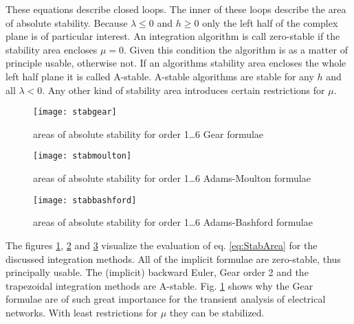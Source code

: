 These equations describe closed loops. The inner of these loops
describe the area of absolute stability.  Because $\lambda \le 0$ and
$h \ge 0$ only the left half of the complex plane is of particular
interest.  An integration algorithm is call zero-stable if the
stability area encloses $\mu = 0$.  Given this condition the algorithm
is as a matter of principle usable, otherwise not.  If an algorithms
stability area encloses the whole left half plane it is called
A-stable.  A-stable algorithms are stable for any $h$ and all $\lambda
< 0$.  Any other kind of stability area introduces certain
restrictions for $\mu$.

\begin{figure}[ht]
\begin{center}
\texttt{[image: stabgear]}
\end{center}
\caption{areas of absolute stability for order 1\ldots 6 Gear formulae}
\label{fig:StabGear}
\end{figure}
\FloatBarrier

\begin{figure}[ht]
\begin{center}
\texttt{[image: stabmoulton]}
\end{center}
\caption{areas of absolute stability for order 1\ldots 6 Adams-Moulton formulae}
\label{fig:StabMoulton}
\end{figure}
\FloatBarrier

\begin{figure}[ht]
\begin{center}
\texttt{[image: stabbashford]}
\end{center}
\caption{areas of absolute stability for order 1\ldots 6 Adams-Bashford formulae}
\label{fig:StabBashford}
\end{figure}
\FloatBarrier

The figures \ref{fig:StabGear}, \ref{fig:StabMoulton} and
\ref{fig:StabBashford} visualize the evaluation of
eq. \eqref{eq:StabArea} for the discussed integration methods.  All of
the implicit formulae are zero-stable, thus principally usable.  The
(implicit) backward Euler, Gear order 2 and the trapezoidal
integration methods are A-stable.  Fig. \ref{fig:StabGear} shows why
the Gear formulae are of such great importance for the transient
analysis of electrical networks.  With least restrictions for $\mu$
they can be stabilized.

